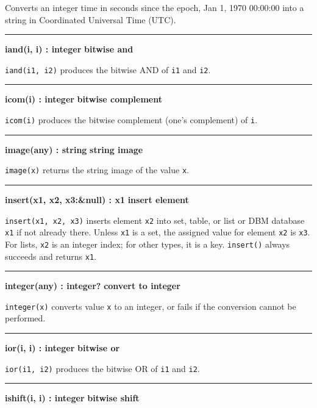 \noindent
Converts an integer time in seconds since the epoch, Jan 1, 1970
00:00:00 into a string in Coordinated Universal Time (UTC). 

\bigskip\hrule\vspace{0.1cm}
\noindent
{\bf iand(i, i) : integer } \hfill {\bf bitwise and}

\noindent
{}\texttt{iand(i1, i2)} produces the bitwise AND of
\texttt{i1} and \texttt{i2}.

\bigskip\hrule\vspace{0.1cm}
\noindent
{\bf icom(i) : integer } \hfill {\bf bitwise complement}

\noindent
\texttt{icom(i)} produces the bitwise complement (one's
complement) of \texttt{i}.

\bigskip\hrule\vspace{0.1cm}
\noindent
{\bf image(any) : string } \hfill {\bf string image}

\noindent
{}\texttt{image(x)} returns the string image of the value
\texttt{x}.

\bigskip\hrule\vspace{0.1cm}
\noindent
{\bf insert(x1, x2, x3:\&null) : x1 } \hfill {\bf insert element}\WarningNotThreadSafe

\noindent
\texttt{insert(x1, x2, x3)} inserts element \texttt{x2} into set, table,
or list or DBM database \texttt{x1} if not already there. Unless
\texttt{x1} is a set, the assigned value for element \texttt{x2} is
\texttt{x3}. For lists, \texttt{x2} is an integer index; for other
types, it is a key. \texttt{insert()} always succeeds
and returns \texttt{x1}.

\bigskip\hrule\vspace{0.1cm}
\noindent
{\bf integer(any) : integer? } \hfill {\bf convert to integer}

\noindent
{}\texttt{integer(x)} converts value \texttt{x}
to an integer, or fails if the conversion cannot be performed.

\bigskip\hrule\vspace{0.1cm}
\noindent
{\bf ior(i, i) : integer } \hfill {\bf bitwise or}

\noindent
{}\texttt{ior(i1, i2)} produces the bitwise OR of
\texttt{i1} and \texttt{i2}.

\bigskip\hrule\vspace{0.1cm}
\noindent
{\bf ishift(i, i) : integer } \hfill {\bf bitwise shift}

